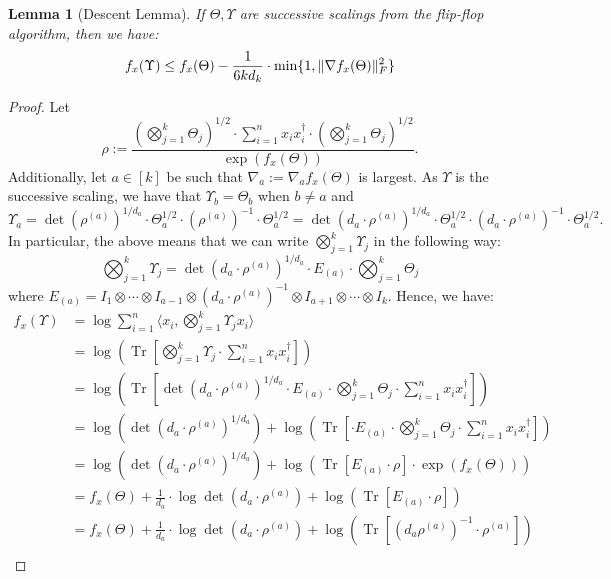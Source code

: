 \documentclass[aos]{imsart}
\newtheorem{lemma}[theorem]{Lemma}
\theoremstyle{definition}
\numberwithin{equation}{section}
\DeclareMathOperator{\tr}{Tr}
\DeclarePairedDelimiter{\norm}{\lVert}{\rVert}
\begin{document}
\begin{lemma}[Descent Lemma]\label{lem:tensor-descent-lemma}
	If $\Theta, \Upsilon$ are successive scalings from the flip-flop algorithm, then we have:
	$$ f_x(\Upsilon) \leq f_x(\Theta) - \dfrac{1}{6k d_k} \cdot \min\{1, \norm{\nabla f_x(\Theta)}_F^2\} $$
\end{lemma}

\begin{proof}
	Let
	$$\rho := \dfrac{\left( \bigotimes_{j=1}^k \Theta_j \right)^{1/2} \cdot \sum_{i=1}^n x_i x_i^\dagger \cdot \left( \bigotimes_{j=1}^k \Theta_j \right)^{1/2}}{\exp(f_x(\Theta))}.$$
	Additionally, let $a \in [k]$ be such that $\nabla_a := \nabla_a f_x(\Theta)$ is largest. As $\Upsilon$ is the successive scaling, we have that $\Upsilon_b = \Theta_b$ when $b \neq a$ and
	$$ \Upsilon_a = \det(\rho^{(a)})^{1/d_a} \cdot \Theta_a^{1/2} \cdot  (\rho^{(a)})^{-1} \cdot \Theta_a^{1/2} = \det(d_a \cdot \rho^{(a)})^{1/d_a} \cdot \Theta_a^{1/2} \cdot (d_a \cdot \rho^{(a)})^{-1} \cdot \Theta_a^{1/2}. $$
	In particular, the above means that we can write $\bigotimes_{j=1}^k \Upsilon_j$ in the following way:
	$$ \bigotimes_{j=1}^k \Upsilon_j = \det(d_a \cdot \rho^{(a)})^{1/d_a} \cdot E_{(a)} \cdot \bigotimes_{j=1}^k \Theta_j $$
	where $E_{(a)} = I_1 \otimes \cdots \otimes I_{a-1} \otimes (d_a \cdot \rho^{(a)})^{-1} \otimes I_{a+1} \otimes \cdots \otimes I_k$.
	Hence, we have:
	\begin{align*}
		f_x(\Upsilon) &= \log \sum_{i=1}^n \langle x_i , \bigotimes_{j=1}^k \Upsilon_j x_i \rangle \\
		&= \log\left(\tr\left[ \bigotimes_{j=1}^k \Upsilon_j \cdot  \sum_{i=1}^n x_i x_i^\dagger  \right]\right) \\
		&= \log\left(\tr\left[ \det(d_a \cdot \rho^{(a)})^{1/d_a} \cdot E_{(a)} \cdot \bigotimes_{j=1}^k \Theta_j \cdot  \sum_{i=1}^n x_i x_i^\dagger  \right]\right) \\
		&= \log\left(\det(d_a \cdot \rho^{(a)})^{1/d_a} \right) +  \log\left(\tr\left[ \cdot E_{(a)} \cdot \bigotimes_{j=1}^k \Theta_j \cdot  \sum_{i=1}^n x_i x_i^\dagger  \right]\right) \\
		&= \log\left(\det(d_a \cdot \rho^{(a)})^{1/d_a} \right) +  \log\left(\tr\left[ E_{(a)} \cdot \rho \right] \cdot \exp(f_x(\Theta)) \right) \\
		&= f_x(\Theta) + \frac{1}{d_a} \cdot  \log\det(d_a \cdot \rho^{(a)})  +  \log\left(\tr\left[ E_{(a)} \cdot \rho \right] \right) \\
		&= f_x(\Theta) + \frac{1}{d_a} \cdot  \log\det(d_a \cdot \rho^{(a)})  +  \log\left(\tr\left[ (d_a \rho^{(a)})^{-1} \cdot \rho^{(a)} \right] \right) \\

\end{align*}
\end{proof}
\end{document}
